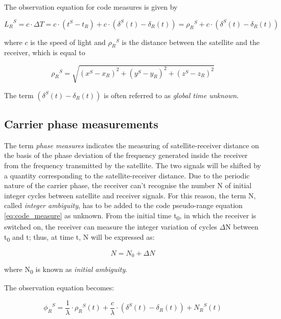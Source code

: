 The observation equation for code measures is given by

\begin{equation}
	{L_{R}}^{S}=c\cdot\Delta T = c\cdot\left(t^{S}-t_{R}\right) + c\cdot\left(\delta^{S}(t)-\delta_{R}(t)\right) = {\rho_{R}}^{S} + c \cdot \left(\delta^{S}(t)-\delta_{R}(t)\right)
	\label{eq:code_measure}
\end{equation}

where $c$ is the speed of light and ${\rho_{R}}^{S}$ is the distance between the satellite and the receiver, which is equal to

\begin{equation}
	{\rho_{R}}^{S}= \sqrt{\left(x^{S}-x_{R}\right)^{2}+\left(y^{S}-y_{R}\right)^{2}+\left(z^{S}-z_{R}\right)^{2}}
	\label{eq:d_sat-ric}
\end{equation}

The term $\left(\delta^{S}(t)-\delta_{R}(t)\right)$ is often referred to as \textit{global time unknown}.

\subsection{Carrier phase measurements}

The term \textit{phase measures} indicates the measuring of satellite-receiver distance on the basis of the phase deviation of the frequency generated inside the receiver from the frequency transmitted by the satellite. The two signals will be shifted by a quantity corresponding to the satellite-receiver distance.
Due to the periodic nature of the carrier phase, the receiver can't recognise the number N of initial integer cycles between satellite and receiver signals. For this reason, the term N, called \textit{integer ambiguity}, has to be added to the code pseudo-range equation \ref{eq:code_measure} as unknown. From the initial time t\textsubscript{0}, in which the receiver is switched on, the receiver can measure the integer variation of cycles $\Delta$N between t\textsubscript{0} and t; thus, at time t, N will be expressed as:

\begin{equation}
	N=N_{0}+\Delta N
	\label{eq:DeltaNfase}
\end{equation}

where N\textsubscript{0} is known as \textit{initial ambiguity}.

The observation equation becomes:

\begin{equation}
	{\phi_{R}}^{S} = \frac{1}{\lambda}\cdot {\rho_{R}}^{S}(t) + \frac{c}{\lambda}\cdot \left(\delta^{S}(t) - \delta_{R}(t)\right)+ {N_{R}}^{S}(t)
	\label{eq:phase_measure}
\end{equation}

